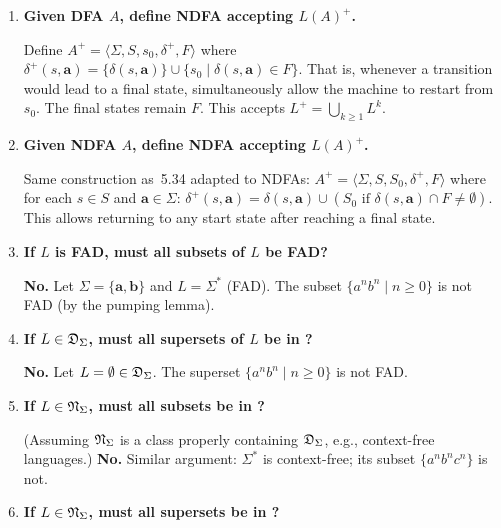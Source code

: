 \begin{enumerate}[{5.}1. ]
$x\in L(A^\cup)$ [Definition of $L(A^\cup)$]
$\Leftrightarrow\DBAR^\cup(S^1_0\cup S^2_0,x)\cap(F_1\cup F_2)\neq\emptyset$ [Def.~4.4]
$\Leftrightarrow(\DBAR^\cup(S^1_0,x)\cup\DBAR^\cup(S^2_0,x))\cap(F_1\cup F_2)\neq\emptyset$ [Exercise~4.27]
$\Leftrightarrow(\DBAR_1(s^1_0,x)\cup\DBAR_2(s^2_0,x))\cap(F_1\cup F_2)\neq\emptyset$ [paths stay in $S_i$]
$\Leftrightarrow\DBAR_1(s^1_0,x)\cap F_1\neq\emptyset$ or $\DBAR_2(s^2_0,x)\cap F_2\neq\emptyset$
$\Leftrightarrow x\in L_1\cup L_2$.

\item \textbf{Given DFA $A$, define NDFA accepting $L(A)^+$.}

Define $A^+=\langle\Sigma,S,s_0,\delta^+,F\rangle$ where
$\delta^+(s,\pmb{a})=\{\delta(s,\pmb{a})\}\cup\{s_0\mid\delta(s,\pmb{a})\in F\}$.
That is, whenever a transition would lead to a final state, simultaneously allow the machine to restart from $s_0$.  The final states remain $F$.  This accepts $L^+=\bigcup_{k\ge 1}L^k$.

\item \textbf{Given NDFA $A$, define NDFA accepting $L(A)^+$.}

Same construction as~5.34 adapted to NDFAs:
$A^+=\langle\Sigma,S,S_0,\delta^+,F\rangle$ where for each $s\in S$ and $\pmb{a}\in\Sigma$:
$\delta^+(s,\pmb{a})=\delta(s,\pmb{a})\cup(S_0\text{ if }\delta(s,\pmb{a})\cap F\neq\emptyset)$.
This allows returning to any start state after reaching a final state.

\item \textbf{If $L$ is FAD, must all subsets of $L$ be FAD?}

\textbf{No.}  Let $\Sigma=\{\pmb{a},\pmb{b}\}$ and $L=\Sigma^*$ (FAD).  The subset
$\{a^nb^n\mid n\ge 0\}$ is not FAD (by the pumping lemma).

\item \textbf{If $L\in\mathfrak{D}_\Sigma$, must all supersets of $L$ be in \DSIG?}

\textbf{No.}  Let $L=\emptyset\in\mathfrak{D}_\Sigma$.  The superset $\{a^nb^n\mid n\ge 0\}$ is not FAD.

\item \textbf{If $L\in\mathfrak{N}_\Sigma$, must all subsets be in \NSIG?}

(Assuming $\mathfrak{N}_\Sigma$ is a class properly containing $\mathfrak{D}_\Sigma$, e.g., context-free languages.)  \textbf{No.}  Similar argument: $\Sigma^*$ is context-free; its subset $\{a^nb^nc^n\}$ is not.

\item \textbf{If $L\in\mathfrak{N}_\Sigma$, must all supersets be in \NSIG?}


\end{enumerate}
